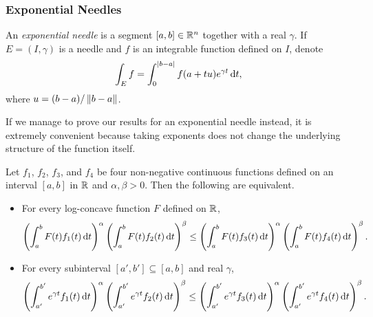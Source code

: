 \subsubsection{Exponential Needles}
\label{sec: 5.1.3}

\begin{definition}
	An \textit{exponential needle} is a segment $[a,b]\in\mathbb{R}^n$ together with a real $\gamma$. If $E=(I,\gamma)$ is a needle and $f$ is an integrable function defined on $I$, denote
	\[ \int_E f = \int_{0}^{|b-a|} f(a+tu)e^{\gamma t} \operatorname{d}\!{t}, \]
	where $u=(b-a)/\left\lVert b-a\right\rVert$.
\end{definition}

If we manage to prove our results for an exponential needle instead, it is extremely convenient because taking exponents does not change the underlying structure of the function itself.

\begin{lemma}
	\label{localized exponential needle interconversion}
	Let $f_1$, $f_2$, $f_3$, and $f_4$ be four non-negative continuous functions defined on an interval $[a,b]$ in $\mathbb{R}$ and $\alpha,\beta>0$. Then the following are equivalent.
	\begin{itemize}
		\item For every log-concave function $F$ defined on $\mathbb{R}$, 
		\[ \left(\int_a^b F(t)f_1(t)\operatorname{d}\!{t}\right)^\alpha \left(\int_a^b F(t)f_2(t)\operatorname{d}\!{t}\right)^\beta \leq \left(\int_a^b F(t)f_3(t)\operatorname{d}\!{t}\right)^\alpha \left(\int_a^b F(t)f_4(t)\operatorname{d}\!{t}\right)^\beta. \]

		\item For every subinterval $[a',b']\subseteq[a,b]$ and real $\gamma$,
		\[ \left(\int_{a'}^{b'} e^{\gamma t}f_1(t)\operatorname{d}\!{t}\right)^\alpha \left(\int_{a'}^{b'} e^{\gamma t}f_2(t)\operatorname{d}\!{t}\right)^\beta \leq \left(\int_{a'}^{b'} e^{\gamma t}f_3(t)\operatorname{d}\!{t}\right)^\alpha \left(\int_{a'}^{b'} e^{\gamma t}f_4(t)\operatorname{d}\!{t}\right)^\beta. \]
	\end{itemize}
\end{lemma}

